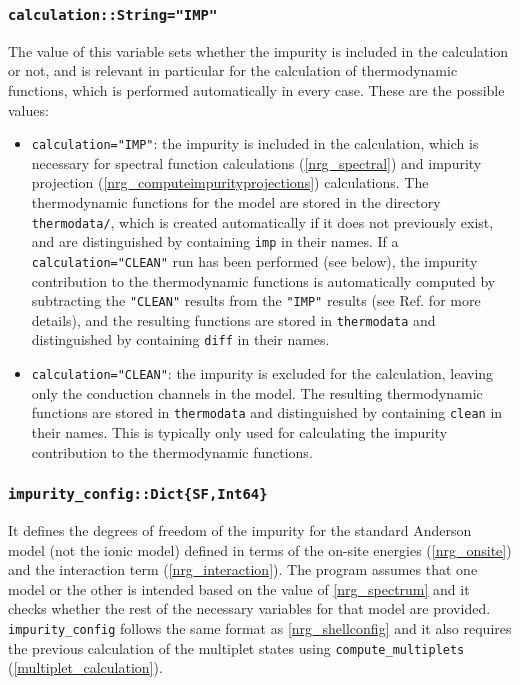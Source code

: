 \documentclass[notitlepage]{article}
\begin{document}
\subsubsection{\texttt{calculation::String="IMP"}}
\label{nrg_calculation}
The value of this variable sets whether the impurity is
included in the calculation or not, and is relevant in
particular for the calculation of thermodynamic functions,
which is performed automatically in every case. These are
the possible values:
\begin{itemize}
    \item \texttt{calculation="IMP"}: the impurity is
    included in the calculation, which is necessary for
    spectral function calculations (\ref{nrg_spectral}) and
    impurity projection
    (\ref{nrg_computeimpurityprojections}) calculations. The
    thermodynamic functions for the model are stored in the
    directory \texttt{thermodata/}, which is created
    automatically if it does not previously exist, and are
    distinguished by containing \texttt{imp} in their names.
    If a \texttt{calculation="CLEAN"} run has been performed
    (see below), the impurity contribution to the
    thermodynamic functions is automatically computed by
    subtracting the \texttt{"CLEAN"} results from the
    \texttt{"IMP"} results (see Ref. \cite{bulla2008} for
    more details), and the resulting functions are stored in
    \texttt{thermodata} and distinguished by containing
    \texttt{diff} in their names. 
    \item \texttt{calculation="CLEAN"}: the impurity is
    excluded for the calculation, leaving only the
    conduction channels in the model. The resulting
    thermodynamic functions are stored in
    \texttt{thermodata} and distinguished by containing
    \texttt{clean} in their names. This is typically only
    used for calculating the impurity contribution to the
    thermodynamic functions. 
\end{itemize}

\subsubsection{\texttt{impurity\_config::Dict\{SF,Int64\}}}
\label{nrg_impurityconfig}
It defines the degrees of freedom of the impurity for the
standard Anderson model (not the ionic model) defined in
terms of the on-site energies (\ref{nrg_onsite}) and the
interaction term (\ref{nrg_interaction}). The program
assumes that one model or the other is intended based on the
value of \ref{nrg_spectrum} and it checks whether the rest
of the necessary variables for that model are provided.
\texttt{impurity\_config} follows the
same format as \ref{nrg_shellconfig} and it also requires
the previous calculation of the multiplet states using
\texttt{compute\_multiplets} (\ref{multiplet_calculation}).
\end{document}
